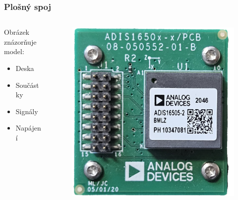 \documentclass[%
  12pt,       				%
	t,                  %
	aspectratio=1610,   %
	unicode,						%
]{beamer}				    	%
\begin{document}
\begin{frame} 
	\frametitle{Plošný spoj}
	
	\begin{columns}[T] 								%
		\begin{column}{0.4\textwidth}		%
			Obrázek znázorňuje model:\\[2ex]
			\begin{itemize}
				\item Deska
				\item Součástky
				\item Signály
				\item Napájení
			\end{itemize}
		\end{column}
		\begin{column}{0.6\textwidth}		%
			\begin{figure}%
				\centering
				\vspace{1cm}	              %
				\includegraphics[width=0.8\columnwidth]{obrazky/ADIS16505PCB}
			\end{figure}
		\end{column}
	\end{columns}											%
\end{frame}
\end{document}
